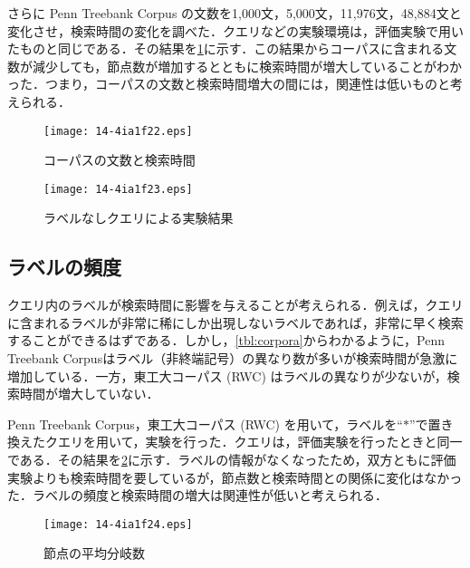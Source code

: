 \documentclass[japanese]{jnlp_1.3e}
\begin{document}
さらに Penn Treebank Corpus の文数を1,000文，5,000文，11,976文，48,884文と変化させ，検索時間の変化を調べた．クエリなどの実験環境は，評価実験で用いたものと同じである．その結果を\figurename\ref{fig:size}に示す．この結果からコーパスに含まれる文数が減少しても，節点数が増加するとともに検索時間が増大していることがわかった．つまり，コーパスの文数と検索時間増大の間には，関連性は低いものと考えられる．

\begin{figure}[t]
	\begin{center}
\texttt{[image: 14-4ia1f22.eps]}
       \caption{コーパスの文数と検索時間}
       \label{fig:size}
       \end{center}
\end{figure}

\begin{figure}[t]
	\begin{center}
\texttt{[image: 14-4ia1f23.eps]}
       \caption{ラベルなしクエリによる実験結果}
       \label{fig:label}
       \end{center}
\end{figure}




\subsection{ラベルの頻度}

クエリ内のラベルが検索時間に影響を与えることが考えられる．例えば，クエリに含まれるラベルが非常に稀にしか出現しないラベルであれば，非常に早く検索することができるはずである．しかし，\tablename\ref{tbl:corpora}からわかるように，Penn Treebank Corpusはラベル（非終端記号）の異なり数が多いが検索時間が急激に増加している．一方，東工大コーパス (RWC) はラベルの異なりが少ないが，検索時間が増大していない．

Penn Treebank Corpus，東工大コーパス (RWC) を用いて，ラベルを``$\ast$''で置き換えたクエリを用いて，実験を行った．クエリは，評価実験を行ったときと同一である．その結果を\figurename\ref{fig:label}に示す．ラベルの情報がなくなったため，双方ともに評価実験よりも検索時間を要しているが，節点数と検索時間との関係に変化はなかった．ラベルの頻度と検索時間の増大は関連性が低いと考えられる．


\begin{figure}[t]
	\begin{center}
\texttt{[image: 14-4ia1f24.eps]}
       \caption{節点の平均分岐数}
       \label{fig:branch}
       \end{center}
\end{figure}
\end{document}
